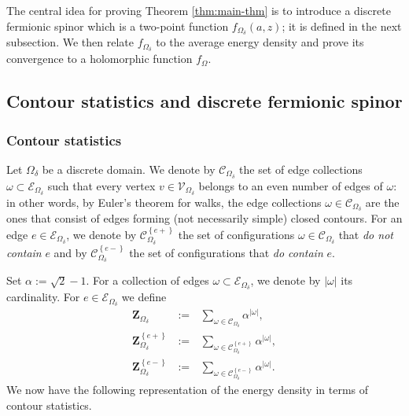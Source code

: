 \documentclass[oneside,english]{amsart}
\numberwithin{equation}{section}
\numberwithin{figure}{section}
\theoremstyle{plain}
\theoremstyle{plain}
\theoremstyle{plain}
\theoremstyle{plain}
\theoremstyle{plain}
\theoremstyle{definition}
\theoremstyle{remark}
\begin{document}
The central idea for proving Theorem \ref{thm:main-thm} is to introduce
a discrete fermionic spinor which is a two-point function $f_{\Omega_{\delta}}\left(a,z\right)$;
it is defined in the next subsection. We then relate $f_{\Omega_{\delta}}$
to the average energy density and prove its convergence to a holomorphic
function $f_{\Omega}$. 


\subsection{\label{sub:contour-stat-disc-hol-spin}Contour statistics and discrete
fermionic spinor}


\subsubsection{Contour statistics}

Let $\Omega_{\delta}$ be a discrete domain. We denote by $\mathcal{C}_{\Omega_{\delta}}$
the set of edge collections $\omega\subset\mathcal{E}_{\Omega_{\delta}}$
such that every vertex $v\in\mathcal{V}_{\Omega_{\delta}}$ belongs
to an even number of edges of $\omega$: in other words, by Euler's
theorem for walks, the edge collections $\omega\in\mathcal{C}_{\Omega_{\delta}}$
are the ones that consist of edges forming (not necessarily simple)
closed contours. For an edge $e\in\mathcal{E}_{\Omega_{\delta}}$,
we denote by $\mathcal{C}_{\Omega_{\delta}}^{\left\{ e+\right\} }$
the set of configurations $\omega\in\mathcal{C}_{\Omega_{\delta}}$
that \emph{do not contain} $e$ and by $\mathcal{C}_{\Omega_{\delta}}^{\left\{ e-\right\} }$
the set of configurations that \emph{do contain} $e$.

Set $\alpha:=\sqrt{2}-1$. For a collection of edges $\omega\subset\mathcal{E}_{\Omega_{\delta}}$,
we denote by $\left|\omega\right|$ its cardinality. For $e\in\mathcal{E}_{\Omega_{\delta}}$
we define
\begin{eqnarray*}
\mathbf{Z}_{\Omega_{\delta}} & \,:=\, & \sum_{\omega\in\mathcal{C}_{\Omega_{\delta}}}\alpha^{\left|\omega\right|},\\
\mathbf{Z}_{\Omega_{\delta}}^{\left\{ e+\right\} } & \,:=\, & \sum_{\omega\in\mathcal{C}_{\Omega_{\delta}}^{\left\{ e+\right\} }}\alpha^{\left|\omega\right|},\\
\mathbf{Z}_{\Omega_{\delta}}^{\left\{ e-\right\} } & \,:=\, & \sum_{\omega\in\mathcal{C}_{\Omega_{\delta}}^{\left\{ e-\right\} }}\alpha^{\left|\omega\right|}.
\end{eqnarray*}
We now have the following representation of the energy density in
terms of contour statistics. 
\end{document}
